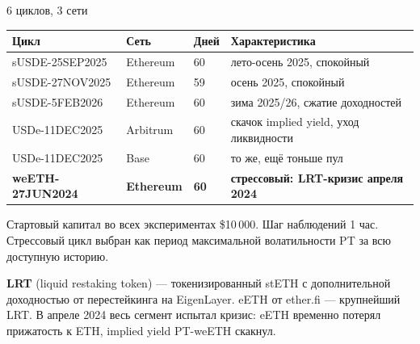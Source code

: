 \documentclass[11pt,aspectratio=169]{beamer}
\begin{document}
\begin{frame}{6 циклов, 3 сети}
  \footnotesize
  \begin{tabular}{p{3.4cm}p{1.5cm}p{0.7cm}p{7.5cm}}
    \toprule
    Цикл & Сеть & Дней & Характеристика \\
    \midrule
    sUSDE-25SEP2025 & Ethereum & 60 & лето-осень 2025, спокойный \\
    sUSDE-27NOV2025 & Ethereum & 59 & осень 2025, спокойный \\
    sUSDE-5FEB2026  & Ethereum & 60 & зима 2025/26, сжатие доходностей \\
    USDe-11DEC2025  & Arbitrum & 60 & скачок implied yield, уход ликвидности \\
    USDe-11DEC2025  & Base     & 60 & то же, ещё тоньше пул \\
    \textbf{weETH-27JUN2024} & \textbf{Ethereum} & \textbf{60} &
    \textbf{стрессовый: LRT-кризис апреля 2024} \\
    \bottomrule
  \end{tabular}

  \vspace{0.5em}
  \normalsize
  Стартовый капитал во всех экспериментах \$10\,000. Шаг наблюдений 1 час.
  Стрессовый цикл выбран как период максимальной волатильности PT за
  всю доступную историю.

  \vspace{0.3em}
  \footnotesize
  \textbf{LRT} (liquid restaking token) --- токенизированный stETH с
  дополнительной доходностью от перестейкинга на EigenLayer.
  eETH от ether.fi --- крупнейший LRT. В апреле 2024 весь сегмент
  испытал кризис: eETH временно потерял прижатость к ETH, implied yield
  PT-weETH скакнул.
\end{frame}
\end{document}

